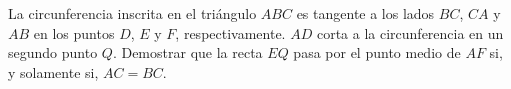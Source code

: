 La circunferencia inscrita en el triángulo $ABC$ es tangente a los lados $BC$, $CA$ y $AB$ en los puntos $D$, $E$ y $F$, respectivamente. $AD$ corta a la circunferencia en un segundo punto $Q$. Demostrar que la recta $EQ$ pasa por el punto medio de $AF$ si, y solamente si, $AC=BC$.
